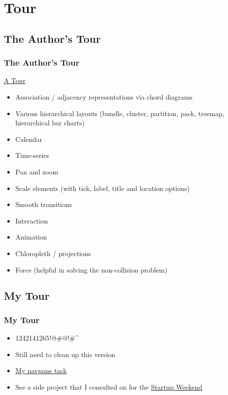 \documentclass{beamer}
\begin{document}
\section{Tour}

\subsection{The Author's Tour}

\begin{frame}
\frametitle{The Author's Tour}
\href{http://mbostock.github.com/d3/talk/20111018/#2}{A Tour}
\begin{itemize}
\item Association / adjacency representations via chord diagrams
\item Various hierarchical layouts (bundle, cluster, partition, pack, treemap, hierarchical bar charts)
\item Calendar
\item Time-series 
\item Pan and zoom 
\item Scale elements (with tick, label, title and location options)
\item Smooth transitions
\item Interaction 
\item Animation
\item Chloropleth / projections
\item Force (helpful in solving the non-collision problem)
\end{itemize}
\end{frame}



\subsection{My Tour}

\begin{frame}
\frametitle{My Tour}
\begin{itemize}
\item 1242141265!@#@!#^%
\item Still need to clean up this version
\item \href{http://localhost:9000/examples/my_cisnet_demo/navpane.html}{My navpane task}
\item See a side project that I consulted on for the \href{http://www.startupweekendviz.johnmorefield.com/d3/examples/SW/map.html}{Startup Weekend}
\end{itemize}
\end{frame}
\end{document}
